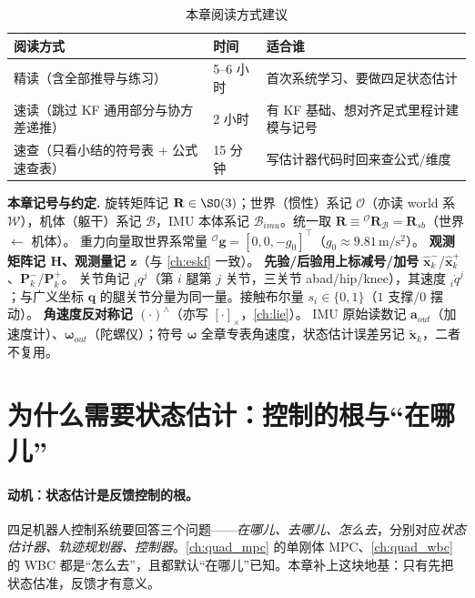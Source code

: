 \begin{table}[H]\centering\small
\caption{本章阅读方式建议}
\begin{tabular}{lll}
\toprule
阅读方式 & 时间 & 适合谁 \\
\midrule
精读（含全部推导与练习） & 5--6 小时 & 首次系统学习、要做四足状态估计 \\
速读（跳过 KF 通用部分与协方差递推） & 2 小时 & 有 KF 基础、想对齐足式里程计建模与记号 \\
速查（只看小结的符号表 + 公式速查表） & 15 分钟 & 写估计器代码时回来查公式/维度 \\
\bottomrule
\end{tabular}
\end{table}

\begin{note}
\textbf{本章记号与约定.}\;
旋转矩阵记 $\mathbf{R}\in\SO(3)$；世界（惯性）系记 $\mathcal{O}$（亦读 world 系 $\mathcal{W}$），机体（躯干）系记 $\mathcal{B}$，IMU 本体系记 $\mathcal{B}_{imu}$。统一取 $\mathbf{R}\equiv{}^{\mathcal{O}}\mathbf{R}_{\mathcal{B}}=\mathbf{R}_{sb}$（世界 $\leftarrow$ 机体）。
重力向量取世界系常量 ${}^{\mathcal{O}}\boldsymbol{g}=[0,0,-g_0]^\top$（$g_0\approx9.81\,\mathrm{m/s^2}$）。
\textbf{观测矩阵记 $\mathbf{H}$、观测量记 $\boldsymbol{z}$}（与 \cref{ch:eskf} 一致）。
\textbf{先验/后验用上标减号/加号} $\hat{\boldsymbol{x}}_k^-$/$\hat{\boldsymbol{x}}_k^+$、$\mathbf{P}_k^-$/$\mathbf{P}_k^+$。
关节角记 ${}_iq^j$（第 $i$ 腿第 $j$ 关节，三关节 abad/hip/knee），其速度 ${}_i\dot q^j$；与广义坐标 $\boldsymbol q$ 的腿关节分量为同一量。接触布尔量 $s_i\in\{0,1\}$（$1$ 支撑/$0$ 摆动）。
\textbf{角速度反对称记 $(\cdot)^\wedge$}（亦写 $[\cdot]_\times$，\cref{ch:lie}）。
IMU 原始读数记 $\boldsymbol{a}_{out}$（加速度计）、$\boldsymbol{\omega}_{out}$（陀螺仪）；符号 $\boldsymbol{\omega}$ 全章专表角速度，状态估计误差另记 $\tilde{\boldsymbol{x}}_k$，二者不复用。
\end{note}

\section{为什么需要状态估计：控制的根与“在哪儿”}
\label{sec:qe-why}

\paragraph{动机：状态估计是反馈控制的根。}
四足机器人控制系统要回答三个问题——\emph{在哪儿、去哪儿、怎么去}，分别对应\emph{状态估计器、轨迹规划器、控制器}\cite{dicarlo2018cheetah}。\cref{ch:quad_mpc} 的单刚体 MPC、\cref{ch:quad_wbc} 的 WBC 都是“怎么去”，且都默认“在哪儿”已知。本章补上这块地基：只有先把状态估准，反馈才有意义。

